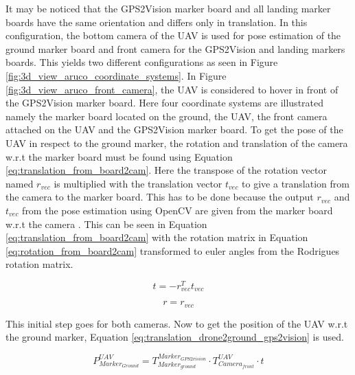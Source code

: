 \documentclass[../Head/report.tex]{subfiles}
\begin{document}
It may be noticed that the GPS2Vision marker board and all landing marker boards have the same orientation and differs only in translation. In this configuration, the bottom camera of the UAV is used for pose estimation of the ground marker board and front camera for the GPS2Vision and landing markers boards. This yields two different configurations as seen in Figure \ref{fig:3d_view_aruco_coordinate_systems}. In Figure \ref{fig:3d_view_aruco_front_camera}, the UAV is considered to hover in front of the GPS2Vision marker board. Here four coordinate systems are illustrated namely the marker board located on the ground, the UAV, the front camera attached on the UAV and the GPS2Vision marker board. To get the pose of the UAV in respect to the ground marker, the rotation and translation of the camera w.r.t  the marker board must be found using Equation \ref{eq:translation_from_board2cam}. Here the transpose of the rotation vector named $r_{vec}$ is multiplied with the translation vector $t_{vec}$ to give a translation from the camera to the marker board. This has to be done because the output $r_{vec}$ and $t_{vec}$ from the pose estimation using OpenCV are given from the marker board w.r.t the camera \cite{theExtrinsicCameraMatrix}. This can be seen in Equation \ref{eq:translation_from_board2cam} with the rotation matrix in Equation \ref{eq:rotation_from_board2cam} transformed to euler angles from the Rodrigues rotation matrix. 

\begin{equation}
	t = -r_{vec}^T t_{vec} 
	\label{eq:translation_from_board2cam}  
\end{equation} 

\begin{equation}
	r = r_{vec} 
	\label{eq:rotation_from_board2cam}  
\end{equation} 

This initial step goes for both cameras. Now to get the position of the UAV w.r.t the ground marker, Equation \ref{eq:translation_drone2ground_gps2vision} is used.

\begin{equation}
	P^{UAV}_{Marker_{Ground}} = T^{Marker_{GPS2vision}}_{Marker_{ground}} \cdot T^{UAV}_{Camera_{front}} \cdot t
	\label{eq:translation_drone2ground_gps2vision} 
\end{equation}
\end{document}
